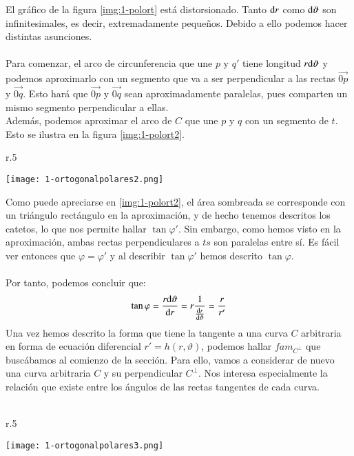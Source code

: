 El gráfico de la figura \ref{img:1-polort} está distorsionado. Tanto $\mathrm{d} r$ como $\mathrm{d} \vartheta$ son infinitesimales, es decir, extremadamente pequeños. Debido a ello podemos hacer distintas asunciones.\\\\
Para comenzar, el arco de circunferencia que une $p$ y $q'$ tiene longitud $r\mathrm{d} \vartheta$ y podemos aproximarlo con un segmento que va a ser perpendicular a las rectas $\vec{0p}$ y $\vec{0q}$. Esto hará que $\vec{0p}$ y $\vec{0q}$ sean aproximadamente paralelas, pues comparten un mismo segmento perpendicular a ellas.\\ Además, podemos aproximar el arco de $C$ que une $p$ y $q$ con un segmento de $t$. Esto se ilustra en la figura \ref{img:1-polort2}.

\begin{wrapfigure}{r}{.5\textwidth}
  \begin{center}
    \texttt{[image: 1-ortogonalpolares2.png]}
  \end{center}
  \caption{Aproximación por infinitesimales}\label{img:1-polort2}
\end{wrapfigure}

Como puede apreciarse en \ref{img:1-polort2}, el área sombreada se corresponde con un triángulo rectángulo en la aproximación, y de hecho tenemos descritos los catetos, lo que nos permite hallar $\tan\varphi'$. Sin embargo, como hemos visto en la aproximación, ambas rectas perpendiculares a $ts$ son paralelas entre sí. Es fácil ver entonces que $\varphi = \varphi'$ y al describir $\tan\varphi'$ hemos descrito $\tan\varphi$.\\\\
Por tanto, podemos concluir que:
$$
\tan\varphi = \frac{r\mathrm{d} \vartheta}{\mathrm{d} r} = r \frac{1}{\frac{\mathrm{d}r}{\mathrm{d}\vartheta}} = \frac{r}{r'}
$$
Una vez hemos descrito la forma que tiene la tangente a una curva $C$ arbitraria en forma de ecuación diferencial $r' = h(r,\vartheta)$, podemos hallar $fam_{C^\perp}$ que buscábamos al comienzo de la sección. Para ello, vamos a considerar de nuevo una curva arbitraria $C$ y su perpendicular $C^\perp$. Nos interesa especialmente la relación que existe entre los ángulos de las rectas tangentes de cada curva.\\\\
\begin{wrapfigure}{r}{.5\textwidth}
  \begin{center}
    \texttt{[image: 1-ortogonalpolares3.png]}
  \end{center}
  \caption{Angulos entre curvas ortogonales}\label{img:1-polort3}
\end{wrapfigure}


